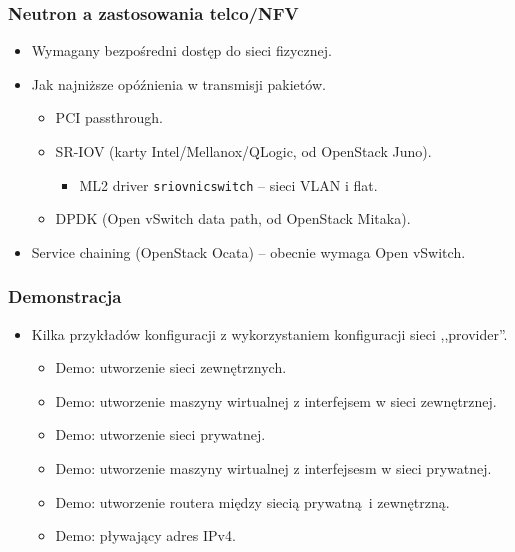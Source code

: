 \documentclass[dvipsnames,table]{beamer}
\begin{document}
\begin{frame}
\frametitle{Neutron a zastosowania telco/NFV}
\begin{itemize}
	\item Wymagany bezpośredni dostęp do sieci fizycznej.
	\item Jak najniższe opóźnienia w transmisji pakietów.
	\begin{itemize}
		\item PCI passthrough.
		\item SR-IOV (karty Intel/Mellanox/QLogic, od OpenStack Juno).
		\begin{itemize}
			\item ML2 driver {\tt sriovnicswitch} -- sieci VLAN i flat.
		\end{itemize}
		\item DPDK (Open vSwitch data path, od OpenStack Mitaka).
	\end{itemize}
	\item Service chaining (OpenStack Ocata) -- obecnie wymaga Open vSwitch.
\end{itemize}
\end{frame}

\begin{frame}
\frametitle{Demonstracja}
\begin{itemize}
	\item Kilka przykładów konfiguracji z wykorzystaniem konfiguracji sieci ,,provider''. 
	\begin{itemize}
		\item Demo: utworzenie sieci zewnętrznych.
		\item Demo: utworzenie maszyny wirtualnej z interfejsem w sieci zewnętrznej.
		\item Demo: utworzenie sieci prywatnej.
		\item Demo: utworzenie maszyny wirtualnej z interfejsesm w sieci prywatnej.
		\item Demo: utworzenie routera między siecią prywatną i zewnętrzną.
		\item Demo: pływający adres IPv4.
	\end{itemize}
\end{itemize}
\end{frame}
\end{document}
